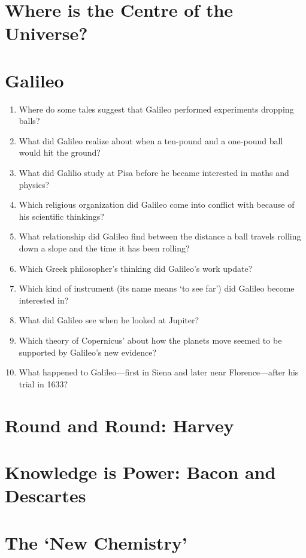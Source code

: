 \documentclass[a4paper,12pt]{article}
\begin{document}
\section{Where is the Centre of the Universe?} %

\section{Galileo} %

\begin{enumerate}
\item Where do some tales suggest that Galileo performed experiments dropping balls?
\item What did Galileo realize about when a ten-pound and a one-pound ball would hit the ground?
\item What did Galilio study at Pisa before he became interested in maths and physics?
\item Which religious organization did Galileo come into conflict with because of his scientific thinkings?
\item What relationship did Galileo find between the distance a ball travels rolling down a slope and the time it has been rolling?
\item Which Greek philosopher's thinking did Galileo's work update?
\item Which kind of instrument (its name means `to see far') did Galileo become interested in?
\item What did Galileo see when he looked at Jupiter?
\item Which theory of Copernicus' about how the planets move seemed to be supported by Galileo's new evidence?
\item What happened to Galileo---first in Siena and later near Florence---after his trial in 1633?
\end{enumerate}

\section{Round and Round: Harvey} %

\section{Knowledge is Power: Bacon and Descartes} %

\section{The `New Chemistry'} %
\end{document}
